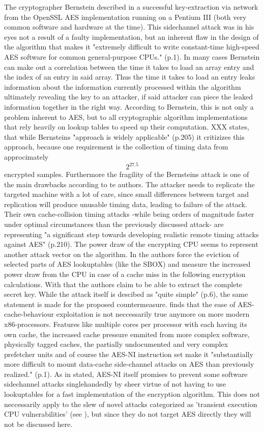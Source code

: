 The cryptographer Bernstein described in \cite{bernsteincache} a successful key-extraction via network from the OpenSSL AES implementation running on a Pentium III (both very common software and hardware at the time). This sidechannel attack was in his eyes not a result of a faulty implementation, but an inherent flaw in the design of the algorithm that makes it "extremely difficult to write constant-time high-speed AES software for common general-purpose CPUs." (p.1). In many cases Bernstein can make out a correlation between the time it takes to load an array entry and the index of an entry in said array. Thus the time it takes to load an entry leaks information about the information currently processed within the algorithm ultimately revealing the key to an attacker, if said attacker can piece the leaked information together in the right way.
According to Bernstein, this is not only a problem inherent to AES, but to all cryptographic algorithm implementations that rely heavily on lookup tables to speed up their computation.
\cite{improvedcache} XXX states, that while Bernsteins "approach is widely applicable" (p.205) it critizizes this approach, because one requirement is the collection of timing data from approcimately \[2^{27.5}\] encrypted samples. Furthermore the fragility of the Bernsteins attack is one of the main drawbacks according to te authors. The attacker needs to replicate the targeted machine with a lot of care, since small differences between target and replication will produce unusable timing data, leading to failure of the attack. Their own cache-collision timing attacks -while being orders of magnitude faster under optimal circumstances than the previously discussed attack- are representing "a significant step towards developing realistic remote timing attacks against AES" (p.210).
The power draw of the encrypting CPU seems to represent another attack vector on the algorithm. In \cite{powerdraw} the authors force the eviction of selected parts of AES lookuptables (like the SBOX) and measure the increased power draw from the CPU in case of a cache miss in the following encryption calculations. With that the authors claim to be able to extract the complete secret key. While the attack itself is descibed as "quite simple" (p.6), the same statement is made for the proposed countermeasure.
\cite{ctattacksfeasible} finds that the ease of AES-cache-behaviour exploitation is not neccessarily true anymore on more modern x86-processors. Features like multiple cores per processor with each having its own cache, the increased cache pressure emmited from more complex software, physically tagged caches, the partially undocumented and very complex prefetcher units and of course the AES-NI instruction set make it "substantially more difficult to mount data-cache side-channel attacks on AES than previously realized." (p.1). As in \cite{aes-ni} stated, AES-NI itself promises to prevent some software sidechannel attacks singlehandedly by sheer virtue of not having to use lookuptables for a fast implementation of the encryption algorithm.
This does not neccessarily apply to the slew of novel attacks categorized as 'transient execution CPU vulnerabilities' (see \cite{transientexecution}), but since they do not target AES directly they will not be discussed here.

